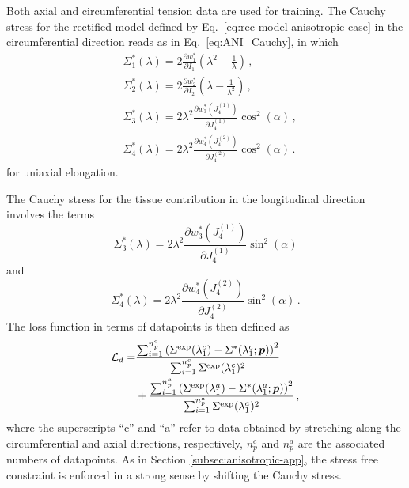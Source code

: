 Both axial and circumferential tension data are used for training. The Cauchy stress for the rectified model defined by Eq.~\eqref{eq:rec-model-anisotropic-case} in the circumferential direction reads as in Eq.~\eqref{eq:ANI_Cauchy}, in which
\begin{align}
    &\Sigma_1^*(\lambda) = 2 \frac{\partial w_1^*}{\partial I_1} \left(\lambda^2 - \frac{1}{\lambda}\right)\,, \\
    &\Sigma_2^*(\lambda) = 2 \frac{\partial w_2^*}{\partial I_2} \left(\lambda - \frac{1}{\lambda^2}\right)\,, \\
    &\Sigma_3^*(\lambda) = 2 \lambda^2 \frac{\partial w_3^*(J_4^{(1)})}{\partial J_4^{(1)}} \cos^2(\alpha)\,,
    \\
    &\Sigma_4^*(\lambda) = 2 \lambda^2 \frac{\partial w_4^*(J_4^{(2)})}{\partial J_4^{(2)}} \cos^2(\alpha)\,.
\end{align}
for uniaxial elongation.

The Cauchy stress for the tissue contribution in the longitudinal direction involves the terms
\begin{equation}
    \Sigma_3^*(\lambda) = 2 \lambda^2 \frac{\partial w_3^*(J_4^{(1)})}{\partial J_4^{(1)}} \sin^2(\alpha)
\end{equation}
and
\begin{equation}
    \Sigma_4^*(\lambda) = 2 \lambda^2 \frac{\partial w_4^*(J_4^{(2)})}{\partial J_4^{(2)}} \sin^2(\alpha)\,.
\end{equation}
The loss function in terms of datapoints is then defined as
\begin{align}
    \mathcal{L}_d = & \frac{\sum_{i=1}^{n_p^c} \left( \Sigma^{\text{exp}}(\lambda_{1}^c) - \Sigma^{*}(\lambda_{1}^c; \boldsymbol{p}) \right)^2}{\sum_{i=1}^{n_p^c} \Sigma^{\text{exp}}(\lambda_{1}^c)^2}  \nonumber \\ 
    & + \frac{\sum_{i=1}^{n_p^a} \left( \Sigma^{\text{exp}}(\lambda_{1}^a) - \Sigma^{*}(\lambda_{1}^a; \boldsymbol{p}) \right)^2}{\sum_{i=1}^{n_p^a} \Sigma^{\text{exp}}(\lambda_{1}^a)^2}\,,
\end{align}
where the superscripts ``c'' and ``a'' refer to data obtained by stretching along the circumferential and axial directions, respectively, $n_p^c$ and $n_p^a$ are the associated numbers of datapoints. As in Section \ref{subsec:anisotropic-app}, the stress free constraint is enforced in a strong sense by shifting the Cauchy stress.


